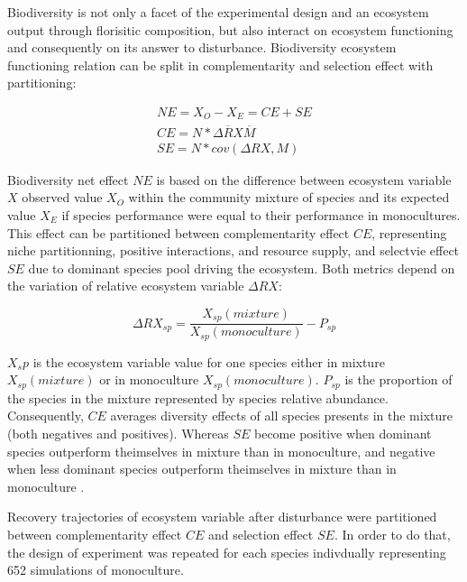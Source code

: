 \documentclass[12pt,]{article}
\theoremstyle{definition}
\theoremstyle{definition}
\theoremstyle{remark}
\begin{document}
Biodiversity is not only a facet of the experimental design and an
ecosystem output through florisitic composition, but also interact on
ecosystem functioning and consequently on its answer to disturbance.
Biodiversity ecosystem functioning relation can be split in
complementarity and selection effect with \citet{Loreau2001}
partitioning:

\begin{equation}
  \begin{array}{c}
    NE = X_O - X_E = CE + SE \\
    CE = N* \overline{\Delta RX} \overline{M}\\
    SE = N*cov(\Delta RX,M)
  \end{array}
  \label{eq:BiodivPart}
\end{equation}

Biodiversity net effect \(NE\) is based on the difference between
ecosystem variable \(X\) observed value \(X_O\) within the community
mixture of species and its expected value \(X_E\) if species performance
were equal to their performance in monocultures. This effect can be
partitioned between complementarity effect \(CE\), representing niche
partitionning, positive interactions, and resource supply, and selectvie
effect \(SE\) due to dominant species pool driving the ecosystem. Both
metrics depend on the variation of relative ecosystem variable
\(\Delta RX\):

\begin{equation}
  \Delta RX_{sp} = \frac{X_{sp}(mixture)}{X_{sp}(monoculture)} - P_{sp}
  \label{eq:DeltaRY}
\end{equation}

\(X_sp\) is the ecosystem variable value for one species either in
mixture \(X_{sp}(mixture)\) or in monoculture \(X_{sp}(monoculture)\).
\(P_{sp}\) is the proportion of the species in the mixture represented
by species relative abundance. Consequently, \(CE\) averages diversity
effects of all species presents in the mixture (both negatives and
positives). Whereas \(SE\) become positive when dominant species
outperform theimselves in mixture than in monoculture, and negative when
less dominant species outperform theimselves in mixture than in
monoculture \citep{Tobner2016}.

Recovery trajectories of ecosystem variable after disturbance were
partitioned between complementarity effect \(CE\) and selection effect
\(SE\). In order to do that, the design of experiment was repeated for
each species indivdually representing 652 simulations of monoculture.
\end{document}
